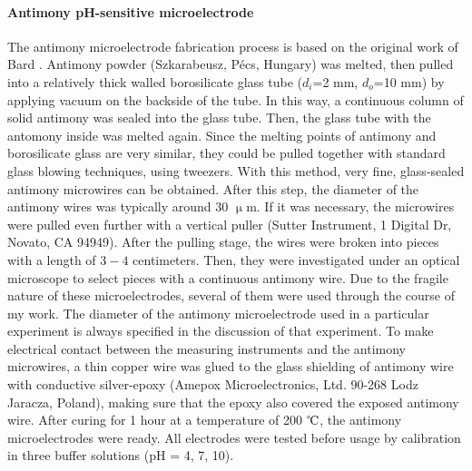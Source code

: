 				\paragraph{Antimony pH-sensitive microelectrode}
The antimony microelectrode fabrication process is based on the original work of Bard \cite{horrocks1993scanning}.
Antimony powder (Szka\-ra\-be\-usz, Pécs, Hungary) was melted, then pulled into a relatively thick walled borosilicate glass tube ($d_i$=2 mm, $d_o$=10 mm) by applying vacuum on the backside of the tube.
In this way, a continuous column of solid antimony was sealed into the glass tube.
Then, the glass tube with the antomony inside was melted again.
Since the melting points of antimony and borosilicate glass are very similar, they could be pulled together with standard glass blowing techniques, using tweezers.
With this method, very fine, glass-sealed antimony microwires can be obtained.
After this step, the diameter of the antimony wires was typically around 30 $\upmu$m.
If it was necessary, the microwires were pulled even further with a vertical puller (Sutter Instrument, 1 Digital Dr, Novato, CA 94949).
After the pulling stage, the wires were broken into pieces with a length of $3-4$ centimeters.
Then, they were investigated under an optical microscope to select pieces with a continuous antimony wire.
Due to the fragile nature of these microelectrodes, several of them were used through the course of my work.
The diameter of the antimony microelectrode used in a particular experiment is always specified in the discussion of that experiment.
To make electrical contact between the measuring instruments and the antimony microwires, a thin copper wire was glued to the glass shielding of antimony wire with conductive silver-epoxy (Amepox Microelectronics, Ltd.
90-268 Lodz Jaracza, Poland), making sure that the epoxy also covered the exposed antimony wire.
After curing for 1 hour at a temperature of 200 $\celsius$, the antimony microelectrodes were ready.
All electrodes were tested before usage by calibration in three buffer solutions (pH = 4, 7, 10). 
